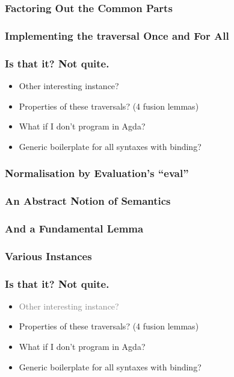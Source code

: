 \documentclass[xetex, mathserif, serif]{beamer}
\begin{document}
  \begin{frame}\frametitle{Factoring Out the Common Parts}
    \unskip
  \end{frame}

  \begin{frame}\frametitle{Implementing the traversal Once and For All}
    \unskip
    \unskip
  \end{frame}

  \begin{frame}\frametitle{Is that it? Not quite.}
    \begin{itemize}
      \item Other interesting instance?
      \item Properties of these traversals? (4 fusion lemmas)
      \item What if I don't program in Agda?
      \item Generic boilerplate for all syntaxes with binding?
    \end{itemize}
  \end{frame}

  \begin{frame}\frametitle{Normalisation by Evaluation's ``eval''}
    \unskip
    \unskip
  \end{frame}

  \begin{frame}\frametitle{An Abstract Notion of Semantics}
  \end{frame}

  \begin{frame}\frametitle{And a Fundamental Lemma}
  \end{frame}

  \begin{frame}\frametitle{Various Instances}
  \end{frame}

  \begin{frame}\frametitle{Is that it? Not quite.}
    \begin{itemize}
      \item \textcolor{gray}{Other interesting instance?}
      \item Properties of these traversals? (4 fusion lemmas)
      \item What if I don't program in Agda?
      \item Generic boilerplate for all syntaxes with binding?
    \end{itemize}
  \end{frame}
\end{document}
